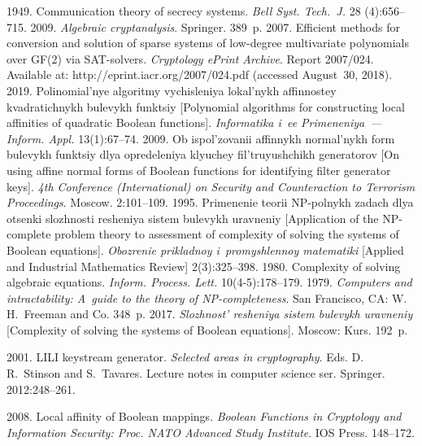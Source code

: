 \begin{multicols}{2}
{{\begin{thebibliography}{99}
 1949. Communication theory of secrecy systems.
\textit{Bell Syst. Tech.~J.} 28 (4):656--715.
 2009. \textit{Algebraic cryptanalysis}. Springer. 389~p.
2007. Efficient methods for conversion and solution of sparse systems of 
low-degree multivariate polynomials over GF(2) via SAT-solvers. 
\textit{Cryptology ePrint Archive}. Report 2007/024. Available at: 
{\sf http://eprint.iacr.org/2007/024.pdf} (accessed August~30, 2018).
2019. Polinomial'nye algoritmy vychisleniya lokal'nykh affinnostey 
kvadratichnykh bulevykh funktsiy [Polynomial algorithms for constructing 
local affinities of quadratic Boolean functions]. 
\textit{Informatika i~ee Primeneniya~--- Inform. Appl.} 13(1):67--74.
 2009. Ob ispol'zovanii affinnykh normal'nykh 
form bulevykh funktsiy dlya opredeleniya klyuchey fil'truyushchikh generatorov 
[On using affine normal forms of Boolean functions for identifying filter generator 
keys]. 
\textit{4th  Conference (International) on Security and
 Counteraction to Terrorism Proceedings}. Moscow. 2:101--109.
 1995. Primenenie teorii NP-polnykh 
zadach dlya otsenki slozhnosti resheniya sistem bulevykh uravneniy 
[Application of the NP-complete problem theory to assessment of 
complexity of solving the systems of Boolean equations].
\textit{Obozrenie prikladnoy i~promyshlennoy matematiki} 
[Applied and Industrial Mathematics Review] 2(3):325--398.
1980. Complexity of solving algebraic equations. 
\textit{Inform. Process. Lett.} 10(4-5):178--179.
 1979. \textit{Computers and intractability: 
A~guide to the theory of NP-completeness}. San Francisco, CA: W.\,H.~Freeman and Co. 
348~p.
2017. \textit{Slozhnost' re\-she\-niya sistem bulevykh uravneniy} [Complexity of solving 
the systems of Boolean equations]. Moscow: Kurs. 192~p.

 2001. LILI keystream generator. 
 \textit{Selected areas in cryptography}. Eds. D.\,R.~Stinson and S.~Tavares.
 Lecture notes in computer science ser. Springer. 2012:248--261.
 
 2008. Local affinity of Boolean mappings. \textit{Boolean Functions in 
 Cryptology and Information Security: Proc. NATO Advanced Study Institute}. 
 IOS Press. 148--172.
 
\end{thebibliography}

 }
 }

\end{multicols}


